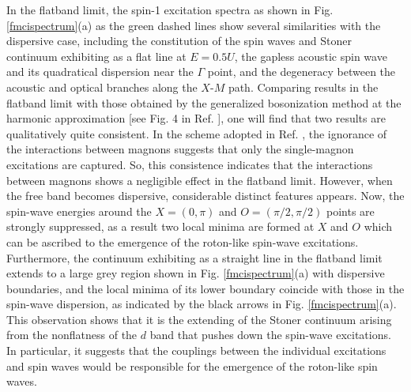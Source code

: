 \documentclass[amsmath,superscriptaddress,showpacs,aps,prb,twocolumn]{revtex4-1}
\begin{document}
\par In the flatband limit, the spin-1 excitation spectra as shown in Fig. \ref{fmcispectrum}(a) as the green dashed lines show several similarities with the dispersive case, including the constitution of the spin waves and Stoner continuum exhibiting as a flat line at $E=0.5U$, the gapless acoustic spin wave and its quadratical dispersion  near the $\Gamma$ point, and the degeneracy between the acoustic and optical branches along the $X$-$M$ path. Comparing results in the flatband limit with those obtained by the generalized bosonization method at the harmonic approximation [see Fig. 4 in Ref. \cite{DG_PRB2015}], one will find that two results are qualitatively quite consistent. In the scheme adopted in Ref. \cite{DG_PRB2015}, the ignorance of the interactions between magnons suggests that only the single-magnon excitations are captured. So, this consistence indicates that the interactions between magnons shows a negligible effect in the flatband limit. However, when the free band becomes dispersive, considerable distinct features appears. Now, the spin-wave energies around the $X=(0,\pi)$ and $O=(\pi/2,\pi/2)$ points are strongly suppressed, as a result two local minima are formed at $X$ and $O$ which can be ascribed to the emergence of the roton-like spin-wave excitations. Furthermore, the continuum exhibiting as a straight line in the flatband limit extends to a large grey region shown in Fig. \ref{fmcispectrum}(a) with dispersive boundaries, and the local minima of its lower boundary coincide with those in the spin-wave dispersion, as indicated by the black arrows in Fig. \ref{fmcispectrum}(a). This observation shows that it is the extending of the Stoner continuum arising from the nonflatness of the $d$ band that pushes down the spin-wave excitations. In particular, it suggests that the couplings between the individual excitations and spin waves would be responsible for the emergence of the roton-like spin waves.
\end{document}
